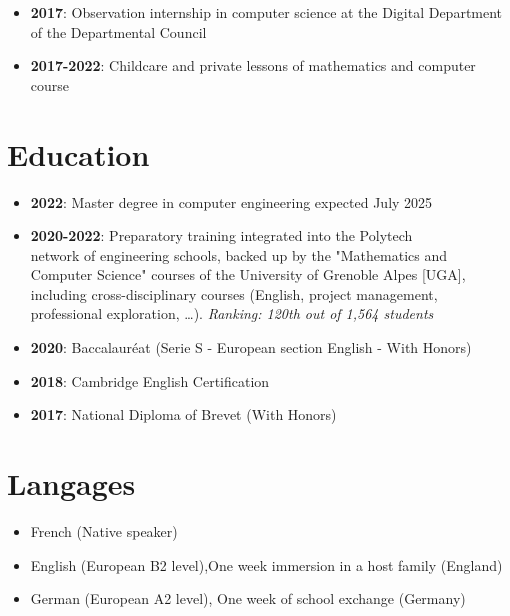 \documentclass[9pt, oneside, a4paper, titlepage]{extarticle}
\begin{document}
\begin{tcolorbox}
\begin{minipage}[t]{12.8cm}
\begin{tcolorbox}[grow to right by = 0.6cm, colback = gray!25, colframe = white]
\begin{itemize}
                    \item \textbf{2017}: Observation internship in computer science at the Digital Department of the Departmental Council
                    
                    \item \textbf{2017-2022}: Childcare and private lessons of mathematics and computer course
                \end{itemize}

                \section*{Education}
                \begin{itemize}
                    \item \textbf{2022}: Master degree in computer engineering expected July 2025
                    \item \textbf{2020-2022}: Preparatory training integrated into the Polytech 
                    \\ network of engineering schools, backed up by the "Mathematics 
                    and Computer Science" courses of the University of Grenoble Alpes [UGA], 
                    including cross-disciplinary courses 
                    (English, project management, professional exploration, \ldots). \emph{Ranking: 120th out of 1,564 students}
                    \item \textbf{2020}: Baccalauréat (Serie S - European section English - With Honors)
                    \item \textbf{2018}: Cambridge English Certification
                    \item \textbf{2017}: National Diploma of Brevet (With Honors)
                \end{itemize}

                \section*{Langages}
                    \begin{itemize}
                        \item French (Native speaker)
                        \item English (European B2 level),One week immersion in a host family (England)
                        \item German (European A2 level), One week of school exchange (Germany)
                    \end{itemize}

                
            \end{tcolorbox}
        \end{minipage}
    \end{tcolorbox}
\end{document}
